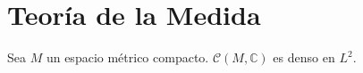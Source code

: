 \section{Teoría de la Medida}

\begin{teorema}
	Sea $M$ un espacio métrico compacto. $\mathcal{C}(M,\mathbb{C})$ es denso en $L^2$.
\end{teorema}

